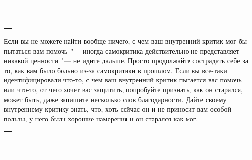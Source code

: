 \setlength{\extrarowheight}{2mm}
\begin{tabularx}{0.96\textwidth}{X}
	\\
	\arrayrulecolor{gray}\hline\\
	\hline\\
	\hline\\
	\hline\\
	\hline\\
	\hline\\	
	\hline\\
	\hline\\
	\hline\\
\end{tabularx}
\setlength{\extrarowheight}{0mm}
\begin{itemize}
	\itemWritingHand Если вы не можете найти вообще ничего, с чем ваш внутренний критик мог бы пытаться вам помочь~"--- иногда самокритика действительно не представляет никакой ценности~"--- не идите дальше. Просто продолжайте сострадать себе за то, как вам было больно из-за самокритики в прошлом. Если вы все-таки идентифицировали что-то, с чем ваш внутренний критик пытается вас помочь или что-то, от чего хочет вас защитить, попробуйте признать, как он старался, может быть, даже запишите несколько слов благодарности. Дайте своему внутреннему критику знать, что, хоть сейчас он и не приносит вам особой пользы, у него были хорошие намерения и он старался как мог.
\end{itemize}

\setlength{\extrarowheight}{2mm}
\begin{tabularx}{0.96\textwidth}{X}
	\\
	\arrayrulecolor{gray}\hline\\
	\hline\\
	\hline\\
	\hline\\
	\hline\\
	\hline\\	
	\hline\\
	\hline\\
	\hline\\
\end{tabularx}
\setlength{\extrarowheight}{0mm}

